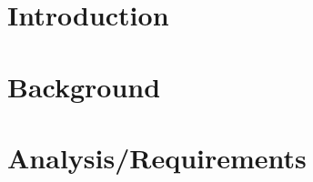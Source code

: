 \documentclass{l4proj}
\begin{document}
%
%
%
%
%
%
%
\chapter{Introduction}







\chapter{Background}

\chapter{Analysis/Requirements}
\end{document}
